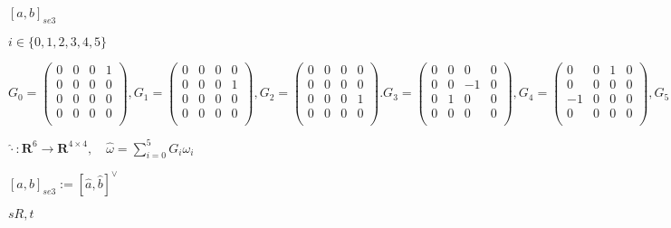 \documentclass{article}
\begin{document}
$ [a, b]_{se3} $
\pagebreak

$ i \in \{0,1,2,3,4,5\} $
\pagebreak

\[ G_0 = \left( \begin{array}{cccc} 0& 0& 0& 1\\ 0& 0& 0& 0\\ 0& 0& 0& 0\\ 0& 0& 0& 0\\ \end{array} \right), G_1 = \left( \begin{array}{cccc} 0& 0& 0& 0\\ 0& 0& 0& 1\\ 0& 0& 0& 0\\ 0& 0& 0& 0\\ \end{array} \right), G_2 = \left( \begin{array}{cccc} 0& 0& 0& 0\\ 0& 0& 0& 0\\ 0& 0& 0& 1\\ 0& 0& 0& 0\\ \end{array} \right). G_3 = \left( \begin{array}{cccc} 0& 0& 0& 0\\ 0& 0& -1& 0\\ 0& 1& 0& 0\\ 0& 0& 0& 0\\ \end{array} \right), G_4 = \left( \begin{array}{cccc} 0& 0& 1& 0\\ 0& 0& 0& 0\\ -1& 0& 0& 0\\ 0& 0& 0& 0\\ \end{array} \right), G_5 = \left( \begin{array}{cccc} 0& -1& 0& 0\\ 1& 0& 0& 0\\ 0& 0& 0& 0\\ 0& 0& 0& 0\\ \end{array} \right). \]
\pagebreak

$ \widehat{\cdot}: \mathbf{R}^6 \rightarrow \mathbf{R}^{4\times 4}, \quad \widehat{\omega} = \sum_{i=0}^5 G_i \omega_i $
\pagebreak

$ [a, b]_{se3} := [\widehat{a}, \widehat{b}]^\vee $
\pagebreak

$sR,t$
\pagebreak
\end{document}

